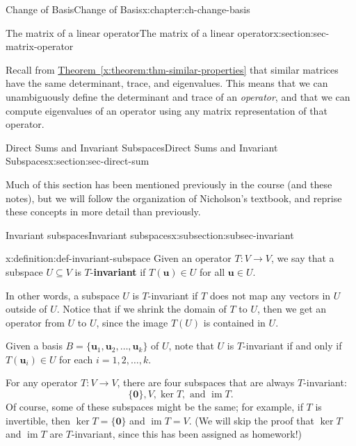 \documentclass[oneside,10pt,]{book}
\newcommand{\xreffont}{\relax}
\newcommand{\terminology}[1]{\textbf{#1}}
\numberwithin{equation}{section}
\newcommand{\im}{\operatorname{im}}
\newcommand{\uu}{\mathbf{u}}
\newcommand{\basis}[2]{\{\mathbf{#1}_1,\mathbf{#1}_2,\ldots,\mathbf{#1}_{#2}\}}
\begin{document}
\begin{chapterptx}{Change of Basis}{}{Change of Basis}{}{}{x:chapter:ch-change-basis}
\begin{sectionptx}{The matrix of a linear operator}{}{The matrix of a linear operator}{}{}{x:section:sec-matrix-operator}
\par
Recall from \hyperref[x:theorem:thm-similar-properties]{Theorem~{\xreffont\ref{x:theorem:thm-similar-properties}}} that similar matrices have the same determinant, trace, and eigenvalues. This means that we can unambiguously define the determinant and trace of an  \emph{operator}, and that we can compute eigenvalues of an operator using any matrix representation of that operator.%
\end{sectionptx}
%
%
\typeout{************************************************}
\typeout{************************************************}
%
\begin{sectionptx}{Direct Sums and Invariant Subspaces}{}{Direct Sums and Invariant Subspaces}{}{}{x:section:sec-direct-sum}
\begin{introduction}{}%
Much of this section has been mentioned previously in the course (and these notes), but we will follow the organization of Nicholson's textbook, and reprise these concepts in more detail than previously.%
\end{introduction}%
%
%
\typeout{************************************************}
\typeout{************************************************}
%
\begin{subsectionptx}{Invariant subspaces}{}{Invariant subspaces}{}{}{x:subsection:subsec-invariant}
\begin{definition}{}{x:definition:def-invariant-subspace}%
Given an operator \(T:V\to V\), we say that a subspace \(U\subseteq V\) is \(T\)-\terminology{invariant} if \(T(\uu)\in U\) for all \(\uu\in U\).%
\end{definition}
In other words, a subspace \(U\) is \(T\)-invariant if \(T\) does not map any vectors in \(U\) outside of \(U\). Notice that if we shrink the domain of \(T\) to \(U\), then we get an operator from \(U\) to \(U\), since the image \(T(U)\) is contained in \(U\).%
\par
Given a basis \(B=\basis{u}{k}\) of \(U\), note that \(U\) is \(T\)-invariant if and only if \(T(\uu_i)\in U\) for each \(i=1,2,\ldots, k\).%
\par
For any operator \(T:V\to V\), there are four subspaces that are always \(T\)-invariant:%
\begin{equation*}
\{\mathbf{0}\}, V, \ker T, \text{ and } \im T\text{.}
\end{equation*}
Of course, some of these subspaces might be the same; for example, if \(T\) is invertible, then \(\ker T = \{\mathbf{0}\}\) and \(\im T = V\). (We will skip the proof that \(\ker T\) and \(\im T\) are \(T\)-invariant, since this has been assigned as homework!)%

\end{subsectionptx}
\end{sectionptx}
\end{chapterptx}
\end{document}
